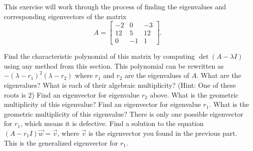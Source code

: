 \documentclass{ximera}
\begin{document}
\begin{exercise}%
    This exercise will work through the process of finding the eigenvalues and corresponding eigenvectors of the matrix
    \begin{equation*}
    A = \begin{bmatrix}
        -2 & 0 & -3 \\ 
        12 & 5  & 12 \\ 
        0 &-1 & 1
    \end{bmatrix}.
    \end{equation*}
    \begin{tasks}
        \task Find the characteristic polynomial of this matrix by computing $\det(A - \lambda I)$ using any method from this section.
        \task This polynomial can be rewritten as $-(\lambda - r_1)^2(\lambda - r_2)$ where $r_1$ and $r_2$ are the eigenvalues of $A$. What are the eigenvalues? What is each of their algebraic multiplicity? (Hint: One of these roots is $2$)
        \task Find an eigenvector for eigenvalue $r_2$ above. What is the geometric multiplicity of this eigenvalue?
        \task Find an eigenvector for eigenvalue $r_1$. What is the geometric multiplicity of this eigenvalue?
        \task There is only one possible eigenvector for $r_1$, which means it is defective. Find a solution to the equation $(A - r_1 I) \vec{w} = \vec{v}$, where $\vec{v}$ is the eigenvector you found in the previous part. This is the generalized eigenvector for $r_1$. 
    \end{tasks}
\end{exercise}
\end{document}
